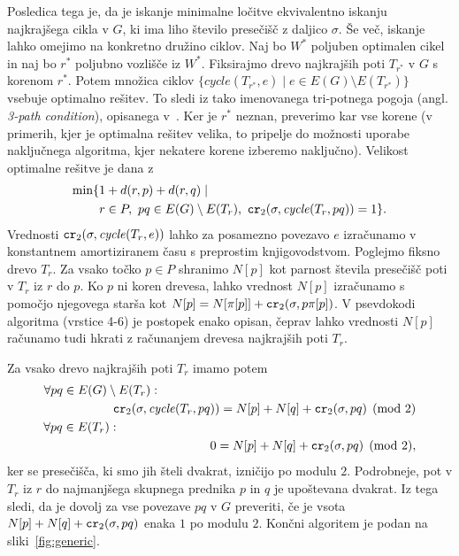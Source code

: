 \documentclass[a4paper, 12pt]{book}
\newcommand{\cycle}{\mathit{cycle}}
\newcommand\CR{\mbox{\tt cr}_2}		  %
\begin{document}
Posledica tega je, da je iskanje minimalne ločitve ekvivalentno iskanju najkrajšega cikla v $G$, ki ima liho število presečišč z daljico $\sigma$. Še več, iskanje lahko omejimo na konkretno družino ciklov. Naj bo $W^*$ poljuben optimalen cikel in naj bo $r^*$ poljubno vozlišče iz $W^*$. Fiksirajmo drevo najkrajših poti $T_{r^*}$ v $G$ s korenom $r^*$. Potem množica ciklov $\{ \cycle(T_{r^*},e)\mid e\in E(G)\setminus E(T_{r^*})\}$ vsebuje optimalno rešitev. To sledi iz tako imenovanega tri-potnega pogoja (angl. \textit{3-path condition}), opisanega v~\cite{CG16}. Ker   je $r^*$ neznan, preverimo kar vse korene (v primerih, kjer je optimalna rešitev velika, to pripelje do možnosti uporabe naključnega algoritma, kjer nekatere korene izberemo naključno). Velikost optimalne rešitve je dana z
\begin{align*}
\min \{& 1+d(r,p)+d(r,q) \mid \\
	   & r\in P,~ pq\in E(G)\setminus E(T_r),~
		\CR(\sigma,\cycle(T_{r},pq))=1 \} .
\end{align*}
Vrednosti $\CR (\sigma, \cycle(T_r,e))$ lahko za posamezno povezavo $e$ izračunamo v konstantnem amortiziranem času s preprostim knjigovodstvom.  Poglejmo fiksno drevo $T_r$. Za vsako točko $p\in P$ shranimo $N[p]$ kot parnost števila presečišč poti v $T_r$ iz $r$ do $p$. Ko $p$ ni koren drevesa, lahko vrednost $N[p]$ izračunamo s pomočjo njegovega starša kot $N[p]=N[\pi[p]]+\CR(\sigma,p\pi[p])$. V psevdokodi algoritma (vrstice 4-6) je  postopek enako opisan, čeprav lahko vrednosti $N[p]$ računamo tudi hkrati z računanjem drevesa najkrajših poti $T_r$.

Za vsako drevo najkrajših poti $T_r$ imamo potem 
\begin{align*}
	\forall pq\in E(G)\setminus E(T_r):~~~~~~~~~~~~~~~~~~~~~~~~~~~~~~~~~~~~~~~~~~~~~~~~~~~~~~~~~~~~~~~\\
	\CR (\sigma, \cycle(T_r,pq)) =N[p]+N[q]+\CR(\sigma,pq) \pmod 2\\
	\forall pq\in E(T_r):~~~~~~~~~~~~~~~~~~~~~~~~~~~~~~~~~~~~~~~~~~~~~~~~~~~~~~~~~~~~~~~~~~~~~~~~~\\
	0 =N[p]+N[q]+\CR(\sigma,pq) \pmod 2,
\end{align*}
ker se presečišča, ki smo jih šteli dvakrat, izničijo po modulu $2$. Podrobneje, pot v $T_r$ iz $r$ do najmanjšega skupnega prednika $p$ in $q$ je upoštevana dvakrat. Iz tega sledi, da je dovolj za vse povezave $pq$ v $G$ preveriti, če je vsota $N[p]+N[q]+\CR(\sigma,pq)$ enaka $1$ po modulu $2$. Končni algoritem je podan na sliki~\ref{fig:generic}.
\end{document}
